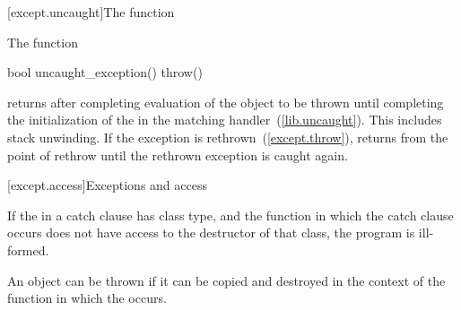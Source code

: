 [except.uncaught]{The  function}%

\pnum
The function
\begin{codeblock}
bool uncaught_exception() throw()
\end{codeblock}
returns
after completing evaluation of the object to be thrown until completing the
initialization of the  in the matching
handler~(\ref{lib.uncaught}).
This includes stack unwinding.
If the exception is rethrown~(\ref{except.throw}),
returns
from the point of rethrow until the rethrown exception is caught again.

[except.access]{Exceptions and access}

\pnum
If the  in a catch clause has class type,
and the function in which the catch clause occurs does not have access to
the destructor of that class, the program is ill-formed.

\pnum
An object can be thrown if it can be copied and destroyed in the context
of the function in which the  occurs.%

